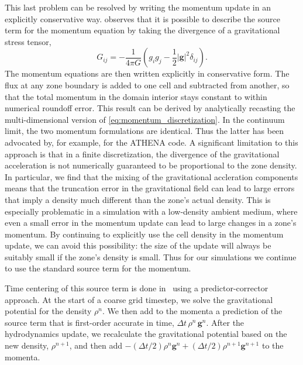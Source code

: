 \documentclass[12pt]{article}
\begin{document}
This last problem can be resolved by writing the momentum update in an explicitly
conservative way. \citet[Chapter 4]{shu:1992} observes that it is possible to describe the source term
for the momentum equation by taking the divergence of a gravitational stress tensor,
\begin{equation}
  G_{ij} = -\frac{1}{4\pi G}\left(g_i g_j - \frac{1}{2}|\mathbf{g}|^2\delta_{ij}\right).
\end{equation}
The momentum equations are then written explicitly in conservative form.
The flux at any zone boundary is added to one cell and
subtracted from another, so that the total momentum in the domain interior stays constant to
within numerical roundoff error. This result can be derived by analytically recasting the
multi-dimensional version of \autoref{eq:momentum_discretization}. In the continuum limit, the two momentum
formulations are identical. Thus the latter has been advocated by, for example,
\cite{jiang:2013} for the ATHENA code. A significant limitation to this approach is that in a finite discretization,
the divergence of the gravitational acceleration is not numerically guaranteed to be proportional to
the zone density. In particular, we find that the mixing of the gravitational accleration components
means that the truncation error in the gravitational field can lead to large errors
that imply a density much different than the zone's actual density. This is especially
problematic in a simulation with a low-density ambient medium, where even a small error
in the momentum update can lead to large changes in a zone's momentum. By continuing to explicitly
use the cell density in the momentum update, we can avoid this possibility: the size of the update
will always be suitably small if the zone's density is small. Thus for our simulations
we continue to use the standard source term for the momentum.

Time centering of this source term is done in \castro\ using a predictor-corrector approach.
At the start of a coarse grid timestep, we solve the gravitational potential for the density $\rho^n$.
We then add to the momenta a prediction of the source term that is first-order accurate in time,
$\Delta t\, \rho^n\, \mathbf{g}^n$. After the hydrodynamics update, we recalculate
the gravitational potential based on the new density, $\rho^{n+1}$, and then add
$-(\Delta t/2) \rho^n \mathbf{g}^n + (\Delta t/2) \rho^{n+1} \mathbf{g}^{n+1}$ to the momenta.
\end{document}
